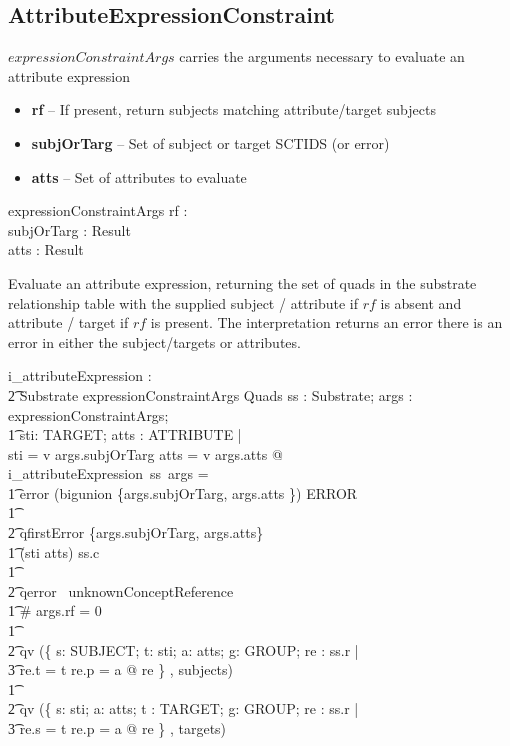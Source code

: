 \documentclass{article}
\begin{document}
\subsection{AttributeExpressionConstraint}
$expressionConstraintArgs$ carries the arguments necessary to evaluate an attribute expression
\begin{itemize}[noitemsep,nolistsep]
\item{\textbf{rf}}  -- If present, return subjects matching attribute/target subjects
\item{\textbf{subjOrTarg}} -- Set of subject or target SCTIDS (or error)
\item{\textbf{atts}}  -- Set of attributes to evaluate
\end{itemize}

\begin{schema}{expressionConstraintArgs}
   rf : \optional[reverseFlag] \\
   subjOrTarg : Result \\
   atts : Result \\
\end{schema}

Evaluate an attribute expression, returning the set of quads in the substrate relationship table
with the supplied subject / attribute if $rf$ is
absent and attribute / target if $rf$ is present.  The interpretation returns an error there is
an error in either the subject/targets or attributes.
\begin{gendef}
   i\_attributeExpression : \\ 
\t2 Substrate \fun expressionConstraintArgs \fun Quads
\where
   \forall ss : Substrate;  args : expressionConstraintArgs; \\
\t1 sti: \power TARGET; atts : \power ATTRIBUTE | \\
   sti = v \inv args.subjOrTarg \land atts = v \inv args.atts @ \\
   i\_attributeExpression~ss~args = \\
\t1 \IF error \inv (bigunion \{args.subjOrTarg, args.atts \}) \in ERROR \\
\t1 \THEN \\
\t2 qfirstError \{args.subjOrTarg, args.atts\} \\
\t1 \ELSE \IF \lnot (sti \cup  atts) \subseteq ss.c \\
\t1 \THEN \\
\t2 qerror~  unknownConceptReference \\
\t1 \ELSE \IF \# args.rf = 0 \\
\t1 \THEN \\
\t2 qv (\{ s: SUBJECT; t: sti; a: atts; g: GROUP; re : ss.r |\\
\t3 re.t = t \land re.p = a @ re \} , subjects) \\
\t1 \ELSE \\
\t2 qv  (\{ s: sti; a: atts; t : TARGET; g: GROUP; re : ss.r | \\
\t3 re.s = t \land re.p = a @ re \} , targets) \\
\end{gendef}
\end{document}
